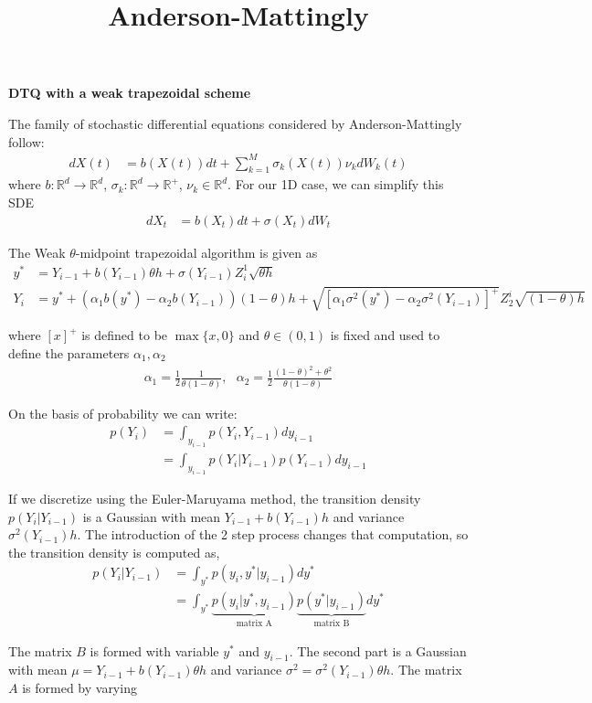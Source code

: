 \documentclass[10pt]{article}
\begin{document}
\vspace*{-15mm}
\title{Anderson-Mattingly}
\begin{center}
\Large\textbf{DTQ with a weak trapezoidal scheme} \\
\normalsize
\end{center}

The family of stochastic differential equations considered by Anderson-Mattingly follow:
\begin{align*}
dX(t) & = b(X(t)) dt + \sum_{k=1}^{M} \sigma_k(X(t)) \nu_k dW_k(t)
\end{align*}
where $b: \mathbb{R}^d \to \mathbb{R}^d$, $\sigma_k: \mathbb{R}^d \to \mathbb{R}^{+}$, $\nu_k \in \mathbb{R}^{d}$. 
For our 1D case, we can simplify this SDE 
\begin{align*}
dX_t & = b(X_t)dt + \sigma (X_t) dW_t
\end{align*}

The Weak $\theta$-midpoint trapezoidal algorithm is given as
\begin{align*}
y^* & = Y_{i-1} + b(Y_{i-1}) \theta h + \sigma(Y_{i-1})Z_i^1 \sqrt{\theta h} \\
Y_{i} & = y^* + (\alpha_1 b(y^*) - \alpha_2 b(Y_{i-1}))(1 - \theta) h + \sqrt{[\alpha_1 \sigma^2(y^*) - \alpha_2\sigma^2(Y_{i-1})]^{+}} Z_2^i \sqrt{(1-\theta)h}
\end{align*}

where $[x]^{+}$ is defined to be $\max \{ x, 0\}$ and $\theta \in (0,1)$ is fixed and used to define the parameters $\alpha_1, \alpha_2$
\begin{align*}
\alpha_1 = \frac{1}{2} \frac{1}{\theta (1-\theta)}, \: \: \:
\alpha_2 = \frac{1}{2} \frac{(1-\theta)^2 + \theta^2}{\theta (1-\theta)}
\end{align*}

On the basis of probability we can write:
\begin{align*}
p(Y_i) & = \int_{y_{i-1}} p(Y_i, Y_{i-1}) dy_{i-1} \\
& = \int_{y_{i-1}} p(Y_i | Y_{i-1}) p(Y_{i-1}) dy_{i-1}
\end{align*}

If we discretize using the Euler-Maruyama method, the transition density $p(Y_i | Y_{i-1})$ is a Gaussian with mean $Y_{i-1} + b(Y_{i-1})h$ and variance $\sigma^2(Y_{i-1})h$. The introduction of the 2 step process changes that computation, so the transition density is computed as,
\begin{align*}
p(Y_i | Y_{i-1}) & = \int_{y^*} p(y_i, y^* | y_{i-1}) dy^* \\
& = \int_{y^*} \underbrace{p(y_i | y^*, y_{i-1})}_{\text{matrix A}} \underbrace{p(y^* | y_{i-1})}_{\text{matrix B}}dy^*
\end{align*}

The matrix $B$ is formed with variable $y^*$ and $y_{i-1}$. The second part is a Gaussian with mean $\mu = Y_{i-1} + b(Y_{i-1})\theta h$ and variance $\sigma^2 = \sigma^2(Y_{i-1})\theta h$. The matrix $A$ is formed by varying 
\end{document}
